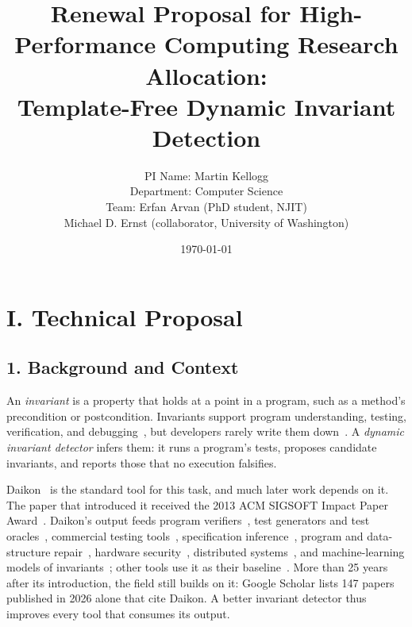\documentclass{article}
\title{\textbf{Renewal Proposal for High-Performance Computing Research Allocation:\\Template-Free Dynamic Invariant Detection}}
\author{PI Name: Martin Kellogg \\ Department: Computer Science \\ Team: Erfan Arvan (PhD student, NJIT) \\ Michael D. Ernst (collaborator, University of Washington)}
\date{\today}
\begin{document}
\maketitle

\section*{I. Technical Proposal}
\setcounter{section}{1} %

\subsection*{1. Background and Context}
An \emph{invariant} is a property that holds at a point in a program, such as a method's precondition or postcondition.
Invariants support program understanding, testing, verification, and debugging~\cite{ErnstCGN2001,ErnstPGMPTX2007,HellendoornDPM2019}, but developers rarely write them down~\cite{ErnstCGN2001,HellendoornDPM2020}.
A \emph{dynamic invariant detector} infers them: it runs a program's tests, proposes candidate invariants, and reports those that no execution falsifies.

Daikon~\cite{ErnstCGN2001,ErnstPGMPTX2007} is the standard tool for this task, and much later work depends on it.
The paper that introduced it received the 2013 ACM SIGSOFT Impact Paper Award~\cite{ImpactAward2013}.
Daikon's output feeds program verifiers~\cite{NimmerE2002:ISSTA,NimmerE2002:FSE},
test generators and test oracles~\cite{CsallnerS2006,AlonsoSR2023},
commercial testing tools~\cite{BoshernitsanDS2006,XieN2003},
specification inference~\cite{MaLLXB2025,MolinaDPRAF2019},
program and data-structure repair~\cite{PerkinsKLABCPSSSWZER2009,DemskyEGMPR2006,DingLTL2020,HuangMMO2024},
hardware security~\cite{ZhangSGCS2017,DeutschbeinS2020,DeutschbeinMRKS2022},
distributed systems~\cite{GrantCB2018,XiaSPDRR2025},
and machine-learning models of invariants~\cite{PeiBSSY2023,HellendoornDPM2019,HellendoornDPM2020}; other tools use it as their baseline~\cite{CsallnerTS2008,MolinaPAF2021}.
More than 25 years after its introduction, the field still builds on it: Google Scholar lists 147 papers published in 2026 alone that cite Daikon.
A better invariant detector thus improves every tool that consumes its output.
\end{document}
